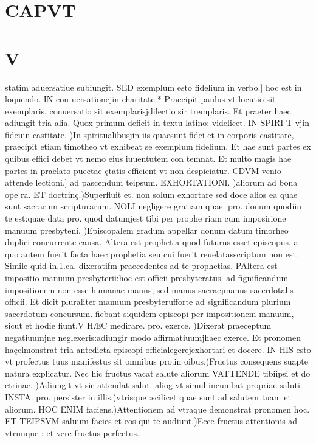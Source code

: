 \documentclass{article}
\begin{document}
\begin{pages}
\section*{CAPVT }
\section*{V }
\marginpar{[ p.144 ]}\pstart statim aduersatiue subiungit. SED exemplum esto fidelium in verbo.] hoc est in loquendo. IN con uersationejin charitate.* Praecipit paulus vt locutio sit exemplaris, conuersatio sit exemplarisjdilectio sir tremplaris. Et praeter haec adiungit tria alia. Quox primum deficit in textu latino: videlicet. IN SPIRI T vjin fideuin castitate. )In spiritualibusjin iis quaesunt fidei et in corporis castitare, praecipit etiam timotheo vt exhibeat se exemplum fidelium. Et hae sunt partes ex quibus effici debet vt nemo eius iuuentutem con temnat. Et multo magis hae partes in praelato puectae çtatis efficient vt non despiciatur.  \pend\pstart CDVM venio attende lectioni.] ad pascendum teipsum. EXHORTATIONI. )aliorum ad bona ope ra. ET doctrinç.)Superfluit et. non solum exhortare sed doce alios ea quae sunt sacrarum scripturarum. NOLI negligere gratiam quae. pro. donum quodiin te est:quae data pro. quod datumjest tibi per prophe riam cum imposirione manuum presbyteni. )Episcopalem gradum appellar donum datum timorheo duplici concurrente causa. Altera est prophetia quod futurus esset episcopus. a quo autem fuerit facta haec prophetia seu cui fuerit reuelatasscriptum non est. Simile quid in.1.ca. dixeratifm praecedentes ad te prophetias. PAltera est impositio manuum presbyterii:hoc est officii presbyteratus. ad fignificandum impositionem non esse humanae manns, sed manus sacraejmanus sacerdotalis officii. Et dicit pluraliter manuum presbyterufforte ad significandum plurium sacerdotum concursum. fiebant siquidem episcopi per impositionem manuum, sicut et hodie fiunt.V HÆC medirare. pro. exerce. )Dixerat praeceptum negatiuumjne neglexeris:adiungir modo affirmatiuumjhaec exerce. Et pronomen haęclmonstrat tria antedicta episcopi officialegerejexhortari et docere. IN HIS esto vt profectus tuus manifestus sit omnibus pro.in oibus.)Fructus consequens suapte natura explicatur. Nec hic fructus vacat salute aliorum VATTENDE tibiipsi et do ctrinae. )Adiungit vt sic attendat saluti aliog vt simul incumbat propriae saluti. INSTA. pro. persister in illis.)vtrisque :scilicet quae sunt ad salutem tuam et aliorum. HOC ENIM faciens.)Attentionem ad vtraque demonstrat pronomen hoc. ET TEIPSVM saluum facies et eos qui te audiunt.)Ecce fructus attentionis ad vtrunque : et vere fructus perfectus.  \pend

\end{pages}
\end{document}
